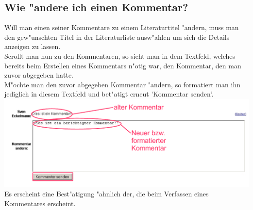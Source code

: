 \subsection{Wie "andere ich einen Kommentar?}
Will man einen seiner Kommentare zu einem Literaturtitel "andern, muss man den gew"unschten Titel in der Literaturliste ausw"ahlen um sich die Details anzeigen zu lassen.\\
Scrollt man nun zu den Kommentaren, so sieht man in dem Textfeld, welches bereits beim Erstellen eines Kommentars n"otig war, den Kommentar, den man zuvor abgegeben hatte.\\
M"ochte man den zuvor abgegeben Kommentar "andern, so formatiert man ihn jediglich in diesem Textfeld und bet"atigt erneut 'Kommentar senden'.\\
\includegraphics[scale=0.8]{comment3}\\
Es erscheint eine Best"atigung "ahnlich der, die beim Verfassen eines Kommentares erscheint.\\

